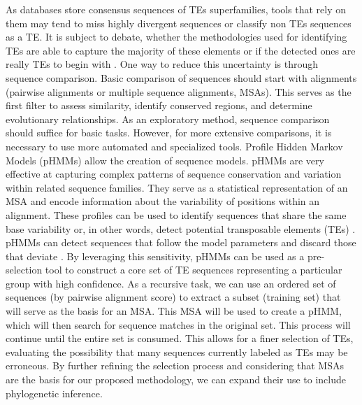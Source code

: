 \documentclass[unnumsec,webpdf,contemporary,large]{oup-authoring-template}%
\theoremstyle{thmstyleone}%
\theoremstyle{thmstyletwo}%
\theoremstyle{thmstylethree}%
\begin{document}
As databases store consensus sequences of TEs superfamilies, tools that rely on them may tend to miss highly divergent sequences or classify non TEs sequences as a TE.  It is subject to debate, whether the methodologies used for identifying TEs are able to capture the majority of these elements or if the detected ones are really TEs to begin with \cite{feschotte_dna_2007,branco_transposable_2023}. One way to reduce this uncertainty is through sequence comparison. Basic comparison of sequences should start with alignments (pairwise alignments or multiple sequence alignments, MSAs). This serves as the first filter to assess similarity, identify conserved regions, and determine evolutionary relationships. As an exploratory method, sequence comparison should suffice for basic tasks. However, for more extensive comparisons, it is necessary to use more automated and specialized tools. Profile Hidden Markov Models (pHMMs) allow the creation of sequence models. pHMMs are very effective at capturing complex patterns of sequence conservation and variation within related sequence families. They serve as a statistical representation of an MSA and encode information about the variability of positions within an alignment. These profiles can be used to identify sequences that share the same base variability or, in other words, detect potential transposable elements (TEs) \cite{storer_dfam_2021, eddy_profile_1998}. pHMMs can detect sequences that follow the model parameters and discard those that deviate \cite{wheeler_dfam_2012}. By leveraging this sensitivity, pHMMs can be used as a pre-selection tool to construct a core set of TE sequences representing a particular group with high confidence. As a recursive task, we can use an ordered set of sequences (by pairwise alignment score) to extract a subset (training set) that will serve as the basis for an MSA. This MSA will be used to create a pHMM, which will then search for sequence matches in the original set. This process will continue until the entire set is consumed. This allows for a finer selection of TEs, evaluating the possibility that many sequences currently labeled as TEs may be erroneous. By further refining the selection process and considering that MSAs are the basis for our proposed methodology, we can expand their use to include phylogenetic inference.
\end{document}
